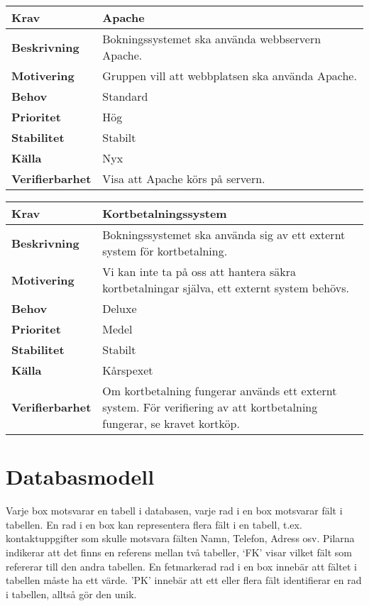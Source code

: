 \documentclass[a4paper, twoside, 11pt, titlepage]{article}
\begin{document}
		\begin{tabular} { p{2.6cm} p{12.5cm} }
			\hline
			\sffamily\textbf{Krav} & Apache  \\
			\hline
			\sffamily\textbf{Beskrivning} & Bokningssystemet ska använda webbservern Apache.  \\
			\hline
			\sffamily\textbf{Motivering} & Gruppen vill att webbplatsen ska använda Apache.  \\
			\hline
			\sffamily\textbf{Behov} & Standard  \\
			\hline
			\sffamily\textbf{Prioritet} & Hög  \\
			\hline
			\sffamily\textbf{Stabilitet} & Stabilt  \\
			\hline
			\sffamily\textbf{Källa} & Nyx  \\
			\hline
			\sffamily\textbf{Verifierbarhet} & Visa att Apache körs på servern.  \\
			\hline
		\end{tabular}
		\vspace{6mm}

		\begin{tabular} { p{2.6cm} p{12.5cm} }
			\hline
			\sffamily\textbf{Krav} & Kortbetalningssystem  \\
			\hline
			\sffamily\textbf{Beskrivning} & Bokningssystemet ska använda sig av ett externt system för kortbetalning.  \\
			\hline
			\sffamily\textbf{Motivering} & Vi kan inte ta på oss att hantera säkra kortbetalningar själva, ett externt system behövs.  \\
			\hline
			\sffamily\textbf{Behov} & Deluxe  \\
			\hline
			\sffamily\textbf{Prioritet} & Medel  \\
			\hline
			\sffamily\textbf{Stabilitet} & Stabilt  \\
			\hline
			\sffamily\textbf{Källa} & Kårspexet  \\
			\hline
			\sffamily\textbf{Verifierbarhet} & Om kortbetalning fungerar används ett externt system. För verifiering av att kortbetalning fungerar, se kravet kortköp.  \\
			\hline
		\end{tabular}


\clearpage
	\appendix

\clearpage
\section{Databasmodell}


Varje box motsvarar en tabell i databasen, varje rad i en box motsvarar fält i tabellen. En rad i en box kan representera flera fält i en tabell, t.ex. kontaktuppgifter som skulle motsvara fälten Namn, Telefon, Adress osv. Pilarna indikerar att det finns en referens mellan två tabeller, ‘FK’ visar vilket fält som refererar till den andra tabellen. En fetmarkerad rad i en box innebär att fältet i tabellen måste ha ett värde. 'PK' innebär att ett eller flera fält identifierar en rad i tabellen, alltså gör den unik.
\end{document}
